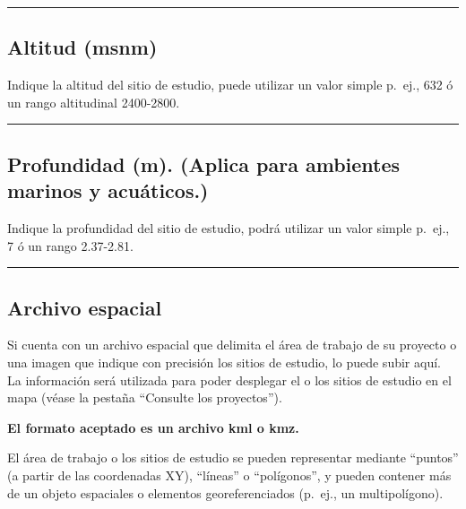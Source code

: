 \documentclass[
]{book}
\begin{document}
\begin{center}\rule{0.5\linewidth}{0.5pt}\end{center}

\hypertarget{altitud-msnm}{%
\subsection*{Altitud (msnm)}\label{altitud-msnm}}

Indique la altitud del sitio de estudio, puede utilizar un valor simple p.~ej., 632 ó un rango altitudinal 2400-2800.

\begin{center}\rule{0.5\linewidth}{0.5pt}\end{center}

\hypertarget{profundidad-m.-aplica-para-ambientes-marinos-y-acuuxe1ticos.}{%
\subsection*{Profundidad (m). (Aplica para ambientes marinos y acuáticos.)}\label{profundidad-m.-aplica-para-ambientes-marinos-y-acuuxe1ticos.}}

Indique la profundidad del sitio de estudio, podrá utilizar un valor simple p.~ej., 7 ó un rango 2.37-2.81.

\begin{center}\rule{0.5\linewidth}{0.5pt}\end{center}

\hypertarget{archivo-espacial}{%
\subsection*{Archivo espacial}\label{archivo-espacial}}

Si cuenta con un archivo espacial que delimita el área de trabajo de su proyecto o una imagen que indique con precisión los sitios de estudio, lo puede subir aquí. La información será utilizada para poder desplegar el o los sitios de estudio en el mapa (véase la pestaña ``Consulte los proyectos'').

\textbf{El formato aceptado es un archivo kml o kmz.}

El área de trabajo o los sitios de estudio se pueden representar mediante ``puntos'' (a partir de las coordenadas XY), ``líneas'' o ``polígonos'', y pueden contener más de un objeto espaciales o elementos georeferenciados (p.~ej., un multipolígono).
\end{document}
